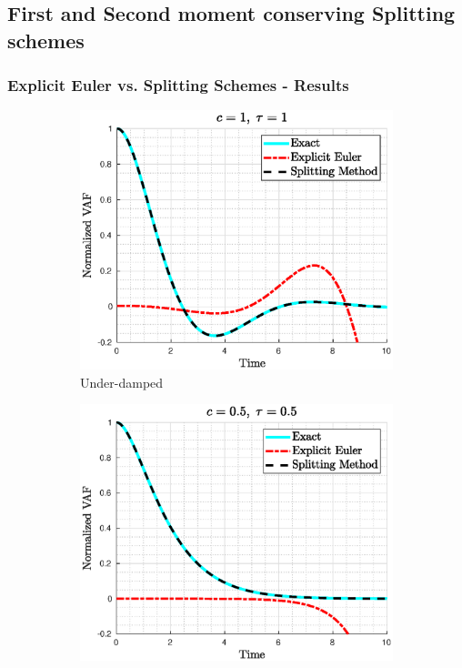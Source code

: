 \documentclass[a4paper,10pt]{beamer}
\begin{document}
	\begin{frame}
		\subsection{First and Second moment conserving Splitting schemes}
		\footnotesize
		\frametitle{Explicit Euler vs. Splitting Schemes - Results}
		\begin{figure}[H]
			\centering
			\begin{subfigure}[b]{0.326\linewidth}
				\includegraphics[width=\linewidth]{./Plots/CaseStudy/Underdamped.eps}
				\caption{Under-damped}
			\end{subfigure}
			\begin{subfigure}[b]{0.326\linewidth}
				\includegraphics[width=\linewidth]{./Plots/CaseStudy/Criticallydamped.eps}

\end{subfigure}
\end{figure}
\end{frame}
\end{document}
